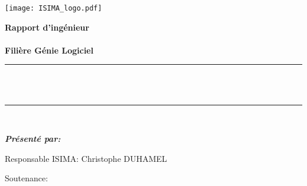 \makeatletter
\begin{titlepage}
  \newcommand{\HRule}{\rule{\linewidth}{0.5mm}}
  \center
  \texttt{[image: ISIMA\_logo.pdf]}
  \vspace{.5cm}



  {\bfseries\Large Rapport d'ingénieur\\[.3cm]
  \sujetLong \\[.5cm]
  \large Filière Génie Logiciel\\[1cm]}
  \HRule \\[0.3cm]
  { \LARGE \bfseries \@title}\\ %
  \HRule \\[1.5cm]

  \begin{flushleft} \Large \bfseries
    \emph{Présenté par:} \@author\\[1cm]
  \end{flushleft}
  \begin{minipage}[t]{0.52\textwidth}
    \begin{flushleft} \large
      Responsable ISIMA: Christophe DUHAMEL%
    \end{flushleft}
  \end{minipage}
  \hfill
  \begin{minipage}[t]{0.42\textwidth}
    \begin{flushleft} \large
      Soutenance: \@date\\[.5cm]

    \end{flushleft}
  \end{minipage}\\[1.5cm]


\end{titlepage}
